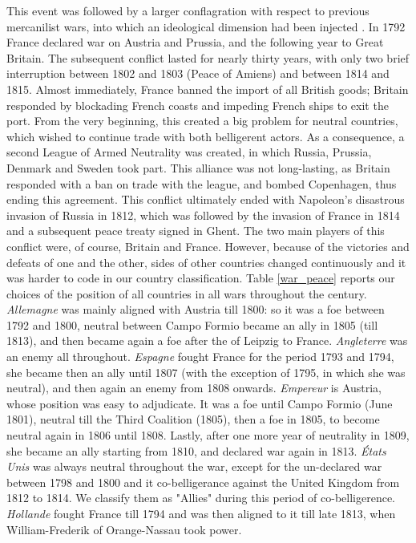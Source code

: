 \documentclass[12pt,a4paper,notitlepage,english]{article}
\begin{document}
\begin{appendix}
This event was followed by a larger conflagration with respect to previous mercanilist wars, into which an ideological dimension had been injected \citep{ORourke2006}.
In 1792 France declared war on Austria and Prussia, and the following year to Great Britain.
The subsequent conflict lasted for nearly thirty years, with only two brief interruption between 1802 and 1803 (Peace of Amiens) and between 1814 and 1815.
Almost immediately, France banned the import of all British goods; Britain responded by blockading French coasts and impeding French ships to exit the port.
From the very beginning, this created a big problem for neutral countries, which wished to continue trade with both belligerent actors.
As a consequence, a second League of Armed Neutrality was created, in which Russia, Prussia, Denmark and Sweden took part.
This alliance was not long-lasting, as Britain responded with a ban on trade with the league, and bombed Copenhagen, thus ending this agreement.
This conflict ultimately ended with Napoleon's disastrous invasion of Russia in 1812, which was followed by the invasion of France in 1814 and a subsequent peace treaty signed in Ghent.
The two main players of this conflict were, of course, Britain and France.
However, because of the victories and defeats of one and the other, sides of other countries changed continuously and it was harder to code in our country classification. Table \ref{war_peace} reports our choices of the position of all countries in all wars throughout the century. 
\textit{Allemagne} was mainly aligned with Austria till 1800: so it was a foe between 1792 and 1800, neutral between Campo Formio became an ally in 1805 (till 1813), and then became again a foe after the 
 of Leipzig to France.
\textit{Angleterre} was an enemy all throughout.
\textit{Espagne} fought France for the period 1793 and 1794, she became then an ally until 1807 (with the exception of 1795, in which she was neutral), and then again an enemy from 1808 onwards.
\textit{Empereur} is Austria, whose position was easy to adjudicate. It was a foe until Campo Formio (June 1801), neutral till the Third Coalition (1805), then a foe in 1805, to become neutral again in 1806 until 1808.
Lastly, after one more year of neutrality in 1809, she became an ally starting from 1810, and declared war again in 1813.
\textit{États Unis} was always neutral throughout the war, except for the un-declared war between 1798 and 1800 and it co-belligerance against the United Kingdom from 1812 to 1814.
We classify them as "Allies" during this period of co-belligerence.
\textit{Hollande} fought France till 1794 and was then aligned to it till late 1813, when William-Frederik of Orange-Nassau took power.

\end{appendix}
\end{document}
